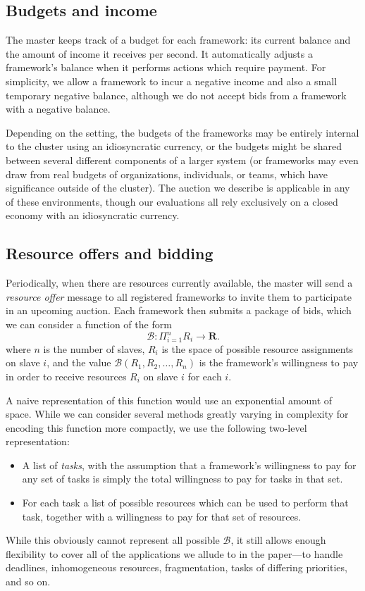 \documentclass{acm_proc_article-sp}
\begin{document}
\subsection{Budgets and income}
The master keeps track of a budget for each framework: its current balance and
the amount of income it receives per second. It automatically adjusts a
framework's balance when it performs actions which require payment. For simplicity,
we allow a framework to incur a negative income and also a small temporary negative balance, although we do not accept bids from a framework with a negative balance.

Depending on the setting, the budgets of the frameworks may be entirely internal to the cluster
using an idiosyncratic currency,
or the budgets might be shared between several different components of a larger system
(or frameworks may even draw from real budgets of organizations, individuals, or teams,
which have significance outside of the cluster).
The auction we describe is applicable in any of these environments,
though our evaluations all rely exclusively on a closed economy with an idiosyncratic currency.

\subsection{Resource offers and bidding}
Periodically, when there are resources currently available, the master will
send a \emph{resource offer} message to all registered frameworks to invite them
to participate in an upcoming auction. Each framework then submits a package of
bids, which we can consider a function of the form
\[ \mathcal{B}: \Pi_{i=1}^n R_i \rightarrow \mathbf{R}. \]
where $n$ is the number of slaves, 
$R_i$ is the space of possible resource assignments on slave $i$,
and the value $\mathcal{B}\left(R_1, R_2, \ldots, R_n\right)$ is the framework's
willingness to pay in order to receive resources $R_i$ on slave $i$ for each $i$.

A naive representation of this function would use an exponential amount of
space. While we can consider several methods greatly varying in
complexity for encoding this function more compactly, we use the following
two-level representation:
\begin{itemize}
  \item A list of \emph{tasks}, with the assumption that a framework's
    willingness to pay for any set of tasks is simply the total
    willingness to pay for tasks in that set.
  \item For each task a list of possible resources which can be used to perform
    that task, together with a willingness to pay for that set of resources.
\end{itemize}
While this obviously cannot represent all possible $\mathcal{B}$, it still
allows enough flexibility to cover all of the applications we allude to
in the paper---to handle deadlines, inhomogeneous resources, fragmentation,
tasks of differing priorities, and so on.
\end{document}
